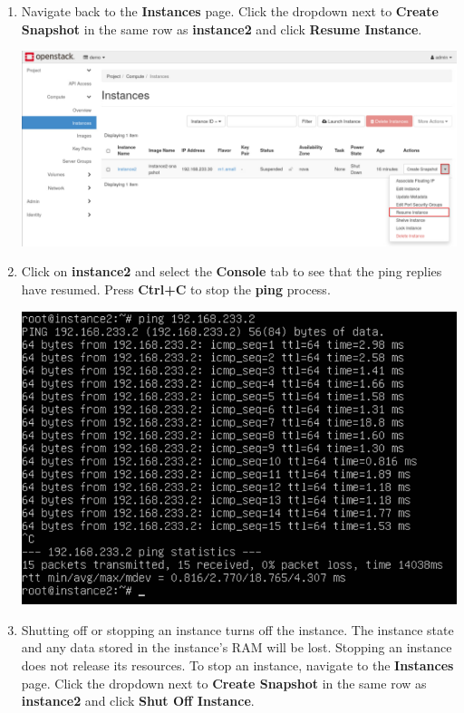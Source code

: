 \documentclass[letterpaper, 12pt]{article}
\begin{document}
\begin{enumerate}
    \item Navigate back to the \textbf{Instances} page. Click the dropdown next to \textbf{Create Snapshot} in the same
    row as \textbf{instance2} and click \textbf{Resume Instance}.

    \begin{center}
        \includegraphics[width=\linewidth]{images/part3/step10.png}
    \end{center}

    \item Click on \textbf{instance2} and select the \textbf{Console} tab to see that the ping replies have resumed.
    Press \textbf{Ctrl+C} to stop the \textbf{ping} process.

    \begin{center}
        \includegraphics[width=\linewidth]{images/part3/step11.png}
    \end{center}

    \item Shutting off or stopping an instance turns off the instance. The instance state and any data stored in the
    instance's RAM will be lost. Stopping an instance does not release its resources. To stop an instance, navigate to
    the \textbf{Instances} page. Click the dropdown next to \textbf{Create Snapshot} in the same row as
    \textbf{instance2} and click \textbf{Shut Off Instance}.


\end{enumerate}
\end{document}
